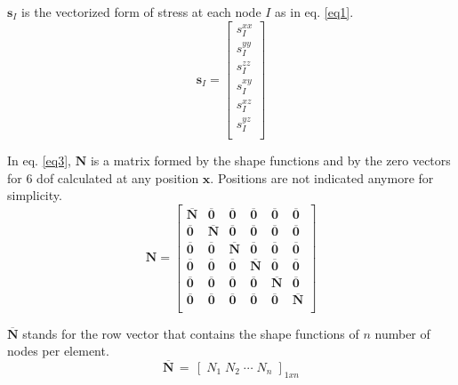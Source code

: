 \documentclass{article}
\begin{document}
$\mathbf{s}_I$ is the vectorized form of stress at each node $I$ as in eq. \eqref{eq1}.
\begin{equation}
\mathbf{s}_I = \left[{
\begin{array}{cc}
	s^{xx}_I\\
	s^{yy}_I\\
	s^{zz}_I\\
	s^{xy}_I\\
	s^{xz}_I\\
	s^{yz}_I\\
\end{array}} \right]
\label{eq1}
\end{equation}


In eq. \eqref{eq3}, $\mathbf{N}$ is a matrix formed by the shape functions and by the zero vectors for 6 dof calculated at any position $\mathbf{x}$. Positions are not indicated anymore for simplicity. 
\begin{equation}
\mathbf{N} = \left[{ \begin{array}{cccccc}
		\mathbf{\overline{N}} & \mathbf{\overline{0}} & \mathbf{\overline{0}} & \mathbf{\overline{0}} & \mathbf{\overline{0}} & \mathbf{\overline{0}} \\
		\mathbf{\overline{0}} & \mathbf{\overline{N}} & \mathbf{\overline{0}} & \mathbf{\overline{0}} & \mathbf{\overline{0}} & \mathbf{\overline{0}} \\
		\mathbf{\overline{0}} & \mathbf{\overline{0}} & \mathbf{\overline{N}} & \mathbf{\overline{0}} & \mathbf{\overline{0}} & \mathbf{\overline{0}} \\
		\mathbf{\overline{0}} & \mathbf{\overline{0}} & \mathbf{\overline{0}} & \mathbf{\overline{N}} & \mathbf{\overline{0}} & \mathbf{\overline{0}} \\
		\mathbf{\overline{0}} & \mathbf{\overline{0}} & \mathbf{\overline{0}} & \mathbf{\overline{0}} & \mathbf{\overline{N}} & \mathbf{\overline{0}} \\
		\mathbf{\overline{0}} & \mathbf{\overline{0}} & \mathbf{\overline{0}} & \mathbf{\overline{0}} & \mathbf{\overline{0}} & \mathbf{\overline{N}} \\
\end{array}} \right] 
\label{eq3}
\end{equation}

$\mathbf{\mathbf{\overline{N}}}$ stands for the row vector that contains the shape functions of $n$ number of nodes per element.
\begin{equation}
\mathbf{\mathbf{\overline{N}}} \,=\, \left[\; N_1\; N_2 \; \cdots\; N_n\; \right]_{1xn}
\end{equation}
\end{document}
